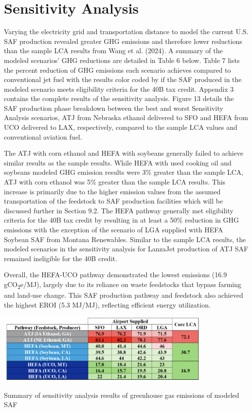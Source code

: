 \documentclass[12pt]{article}
\begin{document}
\section{Sensitivity Analysis}

Varying the electricity grid and transportation distance to model the current U.S. SAF production revealed greater GHG emissions and therefore lower reductions than the sample LCA results from Wang et al. (2024). A summary of the modeled scenarios’ GHG reductions are detailed in Table 6 below. Table 7 lists the percent reduction of GHG emissions each scenario achieves compared to conventional jet fuel with the results color coded by if the SAF produced in the modeled scenario meets eligibility criteria for the 40B tax credit. Appendix 3 contains the complete results of the sensitivity analysis. Figure 13 details the SAF production phase breakdown between the best and worst Sensitivity Analysis scenarios, ATJ from Nebraska ethanol delivered to SFO and HEFA from UCO delivered to LAX, respectively, compared to the sample LCA values and conventional aviation fuel. 

The ATJ with corn ethanol and HEFA with soybeans generally failed to achieve similar results as the sample results. While HEFA with used cooking oil and soybeans modeled GHG emission results were 3\% greater than the sample LCA, ATJ with corn ethanol was 5\% greater than the sample LCA results. This increase is primarily due to the higher emission values from the assumed transportation of the feedstock to SAF production facilities which will be discussed further in Section 9.2. The HEFA pathway generally met eligibility criteria for the 40B tax credit by resulting in at least a 50\% reduction in GHG emissions with the exception of the scenario of LGA supplied with HEFA Soybean SAF from Montana Renewables. Similar to the sample LCA results, the modeled scenarios in the sensitivity analysis for LanzaJet production of ATJ SAF remained ineligible for the 40B credit. 

Overall, the HEFA-UCO pathway demonstrated the lowest emissions (16.9 gCO\textsubscript{2}e/MJ), largely due to its reliance on waste feedstocks that bypass farming and land-use change. This SAF production pathway and feedstock also achieved the highest EROI (5.3 MJ/MJ), reflecting efficient energy utilization.


\begin{table}[H]
\centering
\includegraphics[width=0.8\textwidth]{num.png} %
\caption{Summary of sensitivity analysis results of greenhouse gas emissions of modeled SAF}
\label{table:num}
\end{table}
\end{document}
